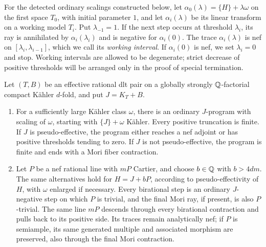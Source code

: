 For the detected ordinary scalings constructed below, let
\(\alpha_0(\lambda)=\{H\}+\lambda\omega\) on the first space
\(T_0\), with initial parameter \(1\), and let \(\alpha_i(\lambda)\)
be its linear transform on a working model \(T_i\). Put
\(\lambda_{-1}=1\). If the next step occurs at threshold
\(\lambda_i\), its ray is annihilated by \(\alpha_i(\lambda_i)\)
and is negative for \(\alpha_i(0)\). The trace \(\alpha_i(\lambda)\)
is nef on \([\lambda_i,\lambda_{i-1}]\), which we call its
\emph{working interval}. If \(\alpha_i(0)\) is nef, we set
\(\lambda_i=0\) and stop. Working intervals are allowed to be
degenerate; strict decrease of positive thresholds will be arranged only
in the proof of special termination.

\begin{lemma}
\label{prog:nef-trivial}
Let \((T,B)\) be an effective rational dlt pair on a globally strongly
\(\mathbb Q\)-factorial compact Kähler \(d\)-fold, and put \(J=K_T+B\).
\begin{enumerate}
\item For a sufficiently large Kähler class \(\omega\), there is an
ordinary \(J\)-program with scaling of \(\omega\), starting with
\(\{J\}+\omega\) Kähler. Every positive truncation is finite.
If \(J\) is pseudo-effective, the program either reaches a nef adjoint
or has positive thresholds tending to zero. If \(J\) is not
pseudo-effective, the program is finite and ends with a Mori fiber
contraction.
\item Let \(P\) be a nef rational line with \(mP\) Cartier, and choose
\(b\in\mathbb Q\) with \(b>4dm\). The same alternatives hold for
\(H=J+bP\), according to pseudo-effectivity of \(H\), with
\(\omega\) enlarged if necessary. Every birational step is an ordinary
\(J\)-negative step on which \(P\) is trivial, and the final Mori
ray, if present, is also \(P\)-trivial. The same line \(mP\) descends
through every birational contraction and pulls back to its positive
side. Its traces remain analytically nef; if \(P\) is semiample, its
same generated multiple and associated morphism are preserved, also
through the final Mori contraction.
\end{enumerate}
\end{lemma}

